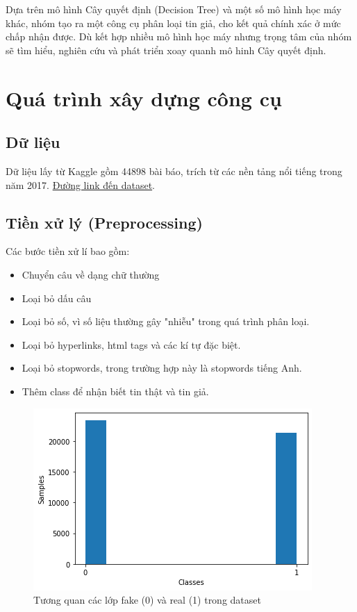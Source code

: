 \documentclass[12pt]{article}
\begin{document}
Dựa trên mô hình Cây quyết định (Decision Tree) và một số mô hình học máy khác, nhóm tạo ra một công cụ phân loại tin giả, cho kết quả chính xác ở mức chấp nhận được. Dù kết hợp nhiều mô hình học máy nhưng trọng tâm của nhóm sẽ tìm hiểu, nghiên cứu và phát triển xoay quanh mô hinh Cây quyết định.
\section{Quá trình xây dựng công cụ}
\subsection{Dữ liệu}
Dữ liệu lấy từ Kaggle gồm 44898 bài báo, trích từ các nền tảng nổi tiếng trong năm 2017. \href{https://www.kaggle.com/datasets/clmentbisaillon/fake-and-real-news-dataset}{Đường link đến dataset}.

\subsection{Tiền xử lý (Preprocessing)}
Các bước tiền xử lí bao gồm:
\begin{itemize}
\item Chuyển câu về dạng chữ thường
\item Loại bỏ dấu câu
\item Loại bỏ số, vì số liệu thường gây "nhiễu" trong quá trình phân loại.
\item Loại bỏ hyperlinks, html tags và các kí tự đặc biệt.
\item Loại bỏ stopwords, trong trường hợp này là stopwords tiếng Anh.
\item Thêm class để nhận biết tin thật và tin giả.
\end{itemize}
\begin{figure}[H]
    \centering
    \includegraphics[scale=.8]{img/data-summerise.png}
    \caption{Tương quan các lớp fake (0) và real (1) trong dataset}
    \label{fig:real_fake_in_train}
\end{figure}
\end{document}
